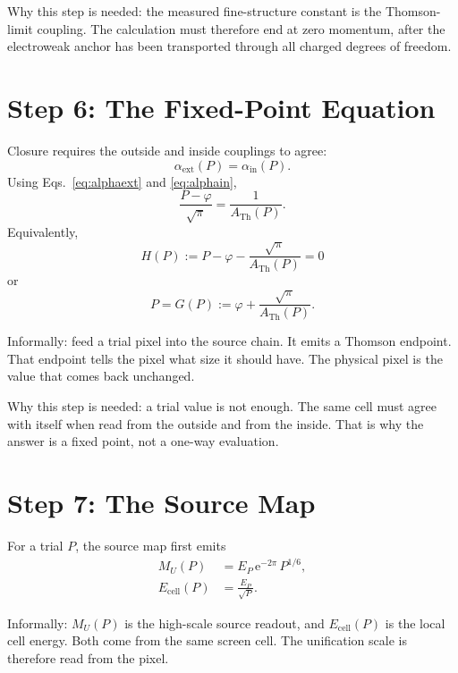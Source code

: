 \documentclass[11pt]{article}
\theoremstyle{remark}
\newcommand{\e}{\mathrm e}
\newcommand{\ATh}{A_{\mathrm{Th}}}
\begin{document}
Why this step is needed: the measured fine-structure constant is the Thomson-limit coupling. The calculation must therefore end at zero momentum, after the electroweak anchor has been transported through all charged degrees of freedom.

\section{Step 6: The Fixed-Point Equation}

Closure requires the outside and inside couplings to agree:
\begin{equation}
\alpha_{\mathrm{ext}}(P)=\alpha_{\mathrm{in}}(P).
\label{eq:couplingmatch}
\end{equation}
Using Eqs.~\eqref{eq:alphaext} and \eqref{eq:alphain},
\begin{equation}
\frac{P-\varphi}{\sqrt\pi}
=
\frac{1}{\ATh(P)}.
\end{equation}
Equivalently,
\begin{equation}
\boxed{
H(P):=P-\varphi-\frac{\sqrt\pi}{\ATh(P)}=0
}
\label{eq:H}
\end{equation}
or
\begin{equation}
\boxed{
P=G(P):=\varphi+\frac{\sqrt\pi}{\ATh(P)}.
}
\label{eq:G}
\end{equation}

Informally: feed a trial pixel into the source chain. It emits a Thomson endpoint. That endpoint tells the pixel what size it should have. The physical pixel is the value that comes back unchanged.

Why this step is needed: a trial value is not enough. The same cell must agree with itself when read from the outside and from the inside. That is why the answer is a fixed point, not a one-way evaluation.

\section{Step 7: The Source Map}

For a trial \(P\), the source map first emits
\begin{align}
M_U(P)&=E_P\,\e^{-2\pi}\,P^{1/6},
\label{eq:MU}\\
E_{\mathrm{cell}}(P)&=\frac{E_P}{\sqrt P}.
\label{eq:Ecell}
\end{align}

Informally: \(M_U(P)\) is the high-scale source readout, and \(E_{\mathrm{cell}}(P)\) is the local cell energy. Both come from the same screen cell. The unification scale is therefore read from the pixel.
\end{document}
